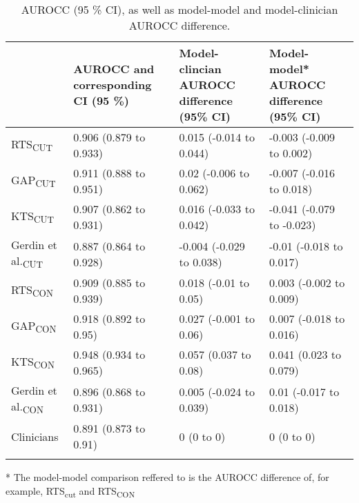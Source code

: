 \begin{table}[!ht]
\centering
\caption{AUROCC (95 \% CI), as well as model-model and model-clinician AUROCC difference.} 
\label{table:auc}
\begin{adjustbox}{max width = \linewidth} 
\begin{threeparttable} 
\begin{tabular} 
{llll}
   & AUROCC and corresponding CI (95 \%) & Model-clincian AUROCC difference (95\% CI) & Model-model* AUROCC difference (95\% CI) \\ 
  \midrule
RTS\textsubscript{CUT} & 0.906 (0.879 to 0.933) & 0.015 (-0.014 to 0.044) & -0.003 (-0.009 to 0.002) \\ 
  GAP\textsubscript{CUT} & 0.911 (0.888 to 0.951) & 0.02 (-0.006 to 0.062) & -0.007 (-0.016 to 0.018) \\ 
  KTS\textsubscript{CUT} & 0.907 (0.862 to 0.931) & 0.016 (-0.033 to 0.042) & -0.041 (-0.079 to -0.023) \\ 
  Gerdin et al.\textsubscript{CUT} & 0.887 (0.864 to 0.928) & -0.004 (-0.029 to 0.038) & -0.01 (-0.018 to 0.017) \\ 
  RTS\textsubscript{CON} & 0.909 (0.885 to 0.939) & 0.018 (-0.01 to 0.05) & 0.003 (-0.002 to 0.009) \\ 
  GAP\textsubscript{CON} & 0.918 (0.892 to 0.95) & 0.027 (-0.001 to 0.06) & 0.007 (-0.018 to 0.016) \\ 
  KTS\textsubscript{CON} & 0.948 (0.934 to 0.965) & 0.057 (0.037 to 0.08) & 0.041 (0.023 to 0.079) \\ 
  Gerdin et al.\textsubscript{CON} & 0.896 (0.868 to 0.931) & 0.005 (-0.024 to 0.039) & 0.01 (-0.017 to 0.018) \\ 
  Clinicians & 0.891 (0.873 to 0.91) & 0 (0 to 0) & 0 (0 to 0) \\ 
   \bottomrule
\addlinespace 
\end{tabular} 
\begin{tablenotes} \footnotesize 
\item[*] The model-model comparison reffered to is the AUROCC difference of, for example, RTS\textsubscript{cut} and RTS\textsubscript{CON} 

\end{tablenotes} 
\end{threeparttable} 
\end{adjustbox}
\end{table}

